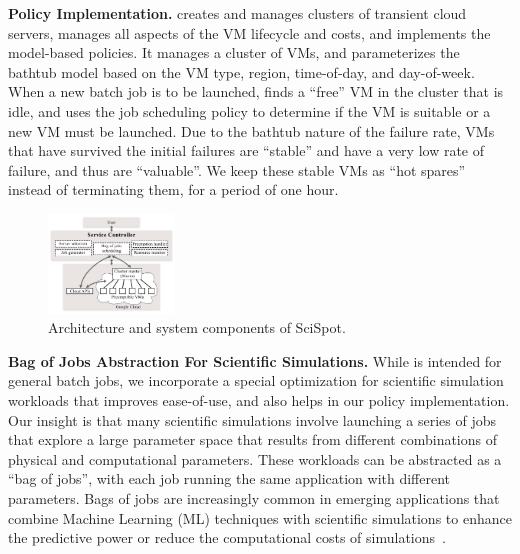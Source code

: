 \noindent \textbf{Policy Implementation.}
\sysname creates and manages clusters of transient cloud servers, manages all aspects of the VM lifecycle and costs, and implements the model-based policies.
It manages a cluster of VMs, and parameterizes the bathtub model based on the VM type, region,  time-of-day, and day-of-week.
When a new batch job is to be launched, \sysname finds a ``free'' VM in the cluster that is idle, and uses the job scheduling policy to determine if the VM is suitable or a new VM must be launched. 
Due to the bathtub nature of the failure rate, VMs that have survived the initial failures are ``stable'' and have a very low rate of failure, and thus are ``valuable''.
We keep these stable VMs as ``hot spares'' instead of terminating them, for a period of one hour. 



\begin{figure}[t]
  \centering 
  \includegraphics[width=0.3\textwidth]{../figures/ArchitectureRevisedV2.pdf}
\vspace*{\myfigspace}
  \caption{Architecture and system components of SciSpot.}
  \label{fig:arch}
  \vspace*{\myfigspace}
\end{figure}


\noindent \textbf{Bag of Jobs Abstraction For Scientific Simulations.}
While \sysname is intended for general batch jobs, we incorporate a special optimization for scientific simulation workloads that improves ease-of-use, and also helps in our policy implementation. 
Our insight is that many scientific simulations involve launching a series of jobs that explore a large parameter space that results from different combinations of physical and computational parameters.
These workloads can be abstracted as a ``bag of jobs'', with each job running the same application with  different parameters.
Bags of jobs are increasingly common in emerging applications that combine Machine Learning (ML) techniques with scientific simulations to enhance the predictive power or reduce the
computational costs of  simulations~\cite{ferguson2017machine,wang2019machine,casalino2021ai,kadupitiya2020machine,kadupitiya2020machine2}. 

